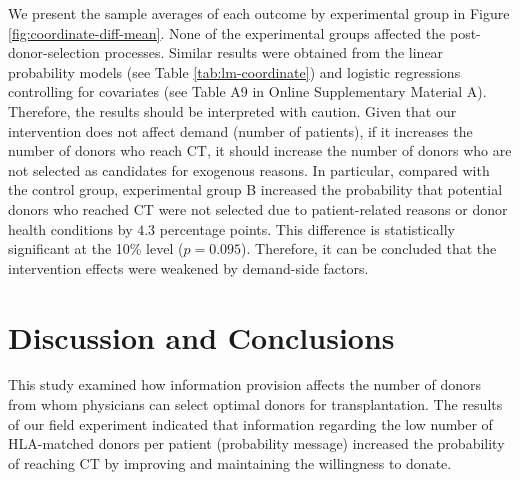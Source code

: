\documentclass[12pt, a4paper]{article}
\begin{document}
We present the sample averages of each outcome by experimental group in Figure \ref{fig:coordinate-diff-mean}. None of the experimental groups affected the post-donor-selection processes. Similar results were obtained from the linear probability models (see Table \ref{tab:lm-coordinate}) and logistic regressions controlling for covariates (see Table A9 in Online Supplementary Material A). Therefore, the results should be interpreted with caution. Given that our intervention does not affect demand (number of patients), if it increases the number of donors who reach CT, it should increase the number of donors who are not selected as candidates for exogenous reasons. In particular, compared with the control group, experimental group B increased the probability that potential donors who reached CT were not selected due to patient-related reasons or donor health conditions by \(4.3\) percentage points. This difference is statistically significant at the 10\% level (\(p = 0.095\)). Therefore, it can be concluded that the intervention effects were weakened by demand-side factors.

\hypertarget{conclusion}{%
\section{Discussion and Conclusions}\label{conclusion}}

This study examined how information provision affects the number of donors from whom physicians can select optimal donors for transplantation. The results of our field experiment indicated that information regarding the low number of HLA-matched donors per patient (probability message) increased the probability of reaching CT by improving and maintaining the willingness to donate.
\end{document}
